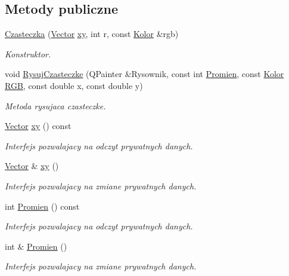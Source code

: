 \subsection*{Metody publiczne}
\begin{DoxyCompactItemize}
\item 
\hyperlink{class_czasteczka_a1e73beeb1253fbb91788eabd65bcb0bf}{Czasteczka} (\hyperlink{class_vector}{Vector} \hyperlink{class_czasteczka_a2568977045d9bfe26054029c7657ad17}{xy}, int r, const \hyperlink{class_kolor}{Kolor} \&rgb)
\begin{DoxyCompactList}\small\item\em Konstruktor. \end{DoxyCompactList}\item 
void \hyperlink{class_czasteczka_a3d143798d7b407fe9dff7b61ab2b8071}{Rysuj\-Czasteczke} (Q\-Painter \&Rysownik, const int \hyperlink{class_czasteczka_a1b550be0425165a213fa1cec985b5478}{Promien}, const \hyperlink{class_kolor}{Kolor} \hyperlink{class_czasteczka_a546104013fe302440214f8809d7ec602}{R\-G\-B}, const double x, const double y)
\begin{DoxyCompactList}\small\item\em Metoda rysujaca czasteczke. \end{DoxyCompactList}\item 
\hyperlink{class_vector}{Vector} \hyperlink{class_czasteczka_a2568977045d9bfe26054029c7657ad17}{xy} () const 
\begin{DoxyCompactList}\small\item\em Interfejs pozwalajacy na odczyt prywatnych danych. \end{DoxyCompactList}\item 
\hyperlink{class_vector}{Vector} \& \hyperlink{class_czasteczka_a103b1c45bfeb9d5fec4acf74cd9d53f0}{xy} ()
\begin{DoxyCompactList}\small\item\em Interfejs pozwalajacy na zmiane prywatnych danych. \end{DoxyCompactList}\item 
int \hyperlink{class_czasteczka_a1b550be0425165a213fa1cec985b5478}{Promien} () const 
\begin{DoxyCompactList}\small\item\em Interfejs pozwalajacy na odczyt prywatnych danych. \end{DoxyCompactList}\item 
int \& \hyperlink{class_czasteczka_abd36efdd1f58cdf8a6a8379bfe663f3b}{Promien} ()
\begin{DoxyCompactList}\small\item\em Interfejs pozwalajacy na zmiane prywatnych danych. \end{DoxyCompactList}\item 

\end{DoxyCompactItemize}
